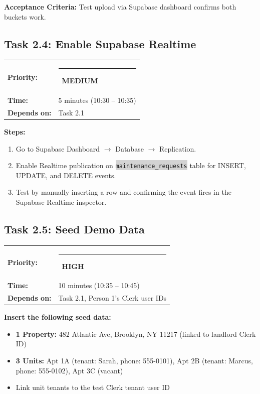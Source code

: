 \documentclass[11pt, a4paper]{article}
\newcommand{\highpri}{\textcolor{highamber}{\rule{6pt}{6pt}}~\textcolor{highamber}{\scriptsize\textbf{HIGH}}}
\newcommand{\medpri}{\textcolor{medgreen}{\rule{6pt}{6pt}}~\textcolor{medgreen}{\scriptsize\textbf{MEDIUM}}}
\newcommand{\code}[1]{\texttt{\small\colorbox{lightgray}{#1}}}
\begin{document}
\textbf{Acceptance Criteria:} Test upload via Supabase dashboard confirms both buckets work.

\vspace{1em}

\subsection{Task 2.4: Enable Supabase Realtime}

\begin{tabularx}{\textwidth}{lX}
\textbf{Priority:} & \medpri \\
\textbf{Time:} & 5 minutes (10:30 -- 10:35) \\
\textbf{Depends on:} & Task 2.1 \\
\end{tabularx}

\vspace{0.3em}

\textbf{Steps:}
\begin{enumerate}[leftmargin=2em, itemsep=2pt]
  \item Go to Supabase Dashboard $\rightarrow$ Database $\rightarrow$ Replication.
  \item Enable Realtime publication on \code{maintenance\_requests} table for INSERT, UPDATE, and DELETE events.
  \item Test by manually inserting a row and confirming the event fires in the Supabase Realtime inspector.
\end{enumerate}

\vspace{1em}

\subsection{Task 2.5: Seed Demo Data}

\begin{tabularx}{\textwidth}{lX}
\textbf{Priority:} & \highpri \\
\textbf{Time:} & 10 minutes (10:35 -- 10:45) \\
\textbf{Depends on:} & Task 2.1, Person 1's Clerk user IDs \\
\end{tabularx}

\vspace{0.3em}

\textbf{Insert the following seed data:}
\begin{itemize}[leftmargin=2em, itemsep=2pt]
  \item \textbf{1 Property:} 482 Atlantic Ave, Brooklyn, NY 11217 (linked to landlord Clerk ID)
  \item \textbf{3 Units:} Apt 1A (tenant: Sarah, phone: 555-0101), Apt 2B (tenant: Marcus, phone: 555-0102), Apt 3C (vacant)
  \item Link unit tenants to the test Clerk tenant user ID
\end{itemize}
\end{document}
